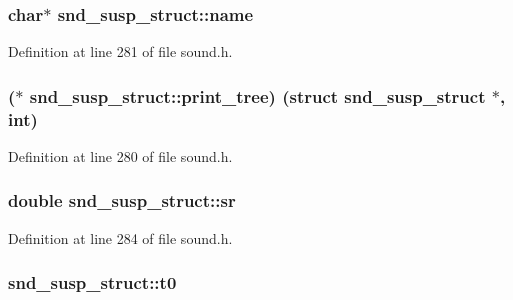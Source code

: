 \subsubsection[{\texorpdfstring{name}{name}}]{\setlength{\rightskip}{0pt plus 5cm}char$\ast$ snd\+\_\+susp\+\_\+struct\+::name}\hypertarget{structsnd__susp__struct_a4d5fa6ba6ea209e5159d06ea00320041}{}\label{structsnd__susp__struct_a4d5fa6ba6ea209e5159d06ea00320041}


Definition at line 281 of file sound.\+h.

\subsubsection[{\texorpdfstring{print\+\_\+tree}{print_tree}}]{($\ast$ snd\+\_\+susp\+\_\+struct\+::print\+\_\+tree) (struct {\bf snd\+\_\+susp\+\_\+struct} $\ast$, {\bf int})}\hypertarget{structsnd__susp__struct_a4403d10e525f61c551eaa74440ee6b7d}{}\label{structsnd__susp__struct_a4403d10e525f61c551eaa74440ee6b7d}


Definition at line 280 of file sound.\+h.

\subsubsection[{\texorpdfstring{sr}{sr}}]{\setlength{\rightskip}{0pt plus 5cm}double snd\+\_\+susp\+\_\+struct\+::sr}\hypertarget{structsnd__susp__struct_a89e4d9a7c1f50a9a0b4bca5ec1c253be}{}\label{structsnd__susp__struct_a89e4d9a7c1f50a9a0b4bca5ec1c253be}


Definition at line 284 of file sound.\+h.

\subsubsection[{\texorpdfstring{t0}{t0}}]{ snd\+\_\+susp\+\_\+struct\+::t0}\hypertarget{structsnd__susp__struct_a5e783b62d30b458070fb80dc0e112594}{}\label{structsnd__susp__struct_a5e783b62d30b458070fb80dc0e112594}


